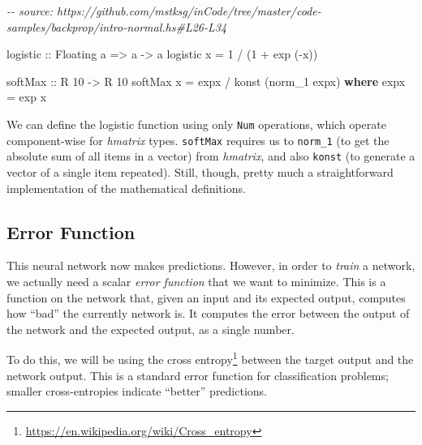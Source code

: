 \documentclass[]{article}
\newenvironment{Shaded}{}{}
\newcommand{\CommentTok}[1]{\textcolor[rgb]{0.38,0.63,0.69}{\textit{#1}}}
\newcommand{\DataTypeTok}[1]{\textcolor[rgb]{0.56,0.13,0.00}{#1}}
\newcommand{\DecValTok}[1]{\textcolor[rgb]{0.25,0.63,0.44}{#1}}
\newcommand{\FunctionTok}[1]{\textcolor[rgb]{0.02,0.16,0.49}{#1}}
\newcommand{\KeywordTok}[1]{\textcolor[rgb]{0.00,0.44,0.13}{\textbf{#1}}}
\newcommand{\NormalTok}[1]{#1}
\newcommand{\OperatorTok}[1]{\textcolor[rgb]{0.40,0.40,0.40}{#1}}
\newcommand{\OtherTok}[1]{\textcolor[rgb]{0.00,0.44,0.13}{#1}}
\renewcommand{\href}[2]{#2\footnote{\url{#1}}}
\begin{document}
\begin{Shaded}
\begin{Highlighting}[]
\CommentTok{{-}{-} source: https://github.com/mstksg/inCode/tree/master/code{-}samples/backprop/intro{-}normal.hs\#L26{-}L34}

\OtherTok{logistic ::} \DataTypeTok{Floating}\NormalTok{ a }\OtherTok{=\textgreater{}}\NormalTok{ a }\OtherTok{{-}\textgreater{}}\NormalTok{ a}
\NormalTok{logistic x }\OtherTok{=} \DecValTok{1} \OperatorTok{/}\NormalTok{ (}\DecValTok{1} \OperatorTok{+} \FunctionTok{exp}\NormalTok{ (}\OperatorTok{{-}}\NormalTok{x))}

\NormalTok{softMax}
\OtherTok{    ::} \DataTypeTok{R} \DecValTok{10}
    \OtherTok{{-}\textgreater{}} \DataTypeTok{R} \DecValTok{10}
\NormalTok{softMax x }\OtherTok{=}\NormalTok{ expx }\OperatorTok{/}\NormalTok{ konst (norm\_1 expx)}
  \KeywordTok{where}
\NormalTok{    expx }\OtherTok{=} \FunctionTok{exp}\NormalTok{ x}
\end{Highlighting}
\end{Shaded}

We can define the logistic function using only \texttt{Num} operations, which
operate component-wise for \emph{hmatrix} types. \texttt{softMax} requires us to
\texttt{norm\_1} (to get the absolute sum of all items in a vector) from
\emph{hmatrix}, and also \texttt{konst} (to generate a vector of a single item
repeated). Still, though, pretty much a straightforward implementation of the
mathematical definitions.

\subsection{Error Function}\label{error-function}

This neural network now makes predictions. However, in order to \emph{train} a
network, we actually need a scalar \emph{error function} that we want to
minimize. This is a function on the network that, given an input and its
expected output, computes how ``bad'' the currently network is. It computes the
error between the output of the network and the expected output, as a single
number.

To do this, we will be using the
\href{https://en.wikipedia.org/wiki/Cross_entropy}{cross entropy} between the
target output and the network output. This is a standard error function for
classification problems; smaller cross-entropies indicate ``better''
predictions.
\end{document}
